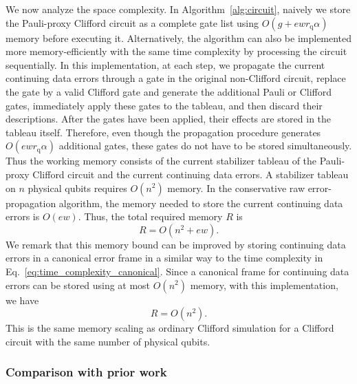\documentclass[
 reprint,
 amsmath,amssymb,
 pra,superscriptaddress, nofootinbib
]{revtex4-2}
\theoremstyle{definition}
\theoremstyle{plain}
\begin{document}
We now analyze the space complexity. 
In Algorithm~\ref{alg:circuit}, naively we store the Pauli-proxy Clifford circuit as a complete gate list using $O(g+ewr_\mathrm{q}\alpha)$ memory before executing it. Alternatively, the algorithm can also be implemented more memory-efficiently with the same time complexity by processing the circuit sequentially. In this implementation, at each step, we propagate the current continuing data errors through a gate in the original non-Clifford circuit, replace the gate by a valid Clifford gate and generate the additional Pauli or Clifford gates, immediately apply these gates to the tableau, and then discard their descriptions.
After the gates have been applied, their effects are stored in the tableau itself. Therefore, even though the propagation procedure generates $O(ewr_\mathrm{q}\alpha)$ additional gates, these gates do not have to be stored simultaneously.
Thus the working memory consists of the current stabilizer tableau of the Pauli-proxy Clifford circuit and the current continuing data errors. 
A stabilizer tableau on $n$ physical qubits requires $O(n^2)$ memory. 
In the conservative raw error-propagation algorithm, the memory needed to store the current continuing data errors is $O(ew)$. 
Thus, the total required memory $R$ is 
\begin{equation}
  R=O(n^2+ew).
\end{equation}
We remark that this memory bound can be improved by storing continuing data errors in a canonical error frame in a similar way to the time complexity in Eq.~\eqref{eq:time_complexity_canonical}. Since a canonical frame for continuing data errors can be stored using at most $O(n^2)$ memory, with this implementation, we have 
\begin{equation}
  R=O(n^2).
\end{equation}
This is the same memory scaling as ordinary Clifford simulation for a Clifford circuit with the same number of physical qubits.

\subsubsection{Comparison with prior work}
\label{subsubsec:comparison}
\end{document}
